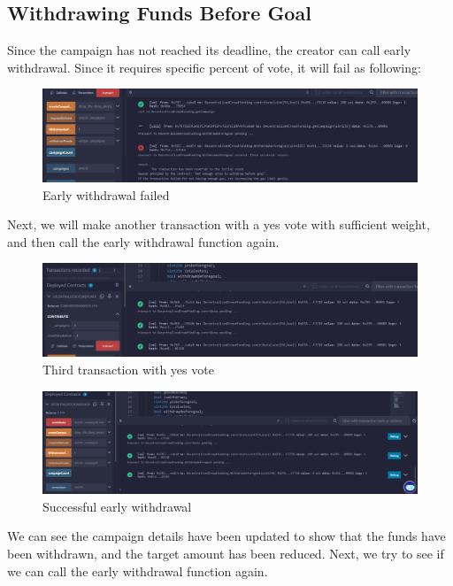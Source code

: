 \documentclass[12pt,reqno]{article}
\begin{document}
\newpage 

\subsection{Withdrawing Funds Before Goal}
Since the campaign has not reached its deadline, the creator can call early 
withdrawal. Since it requires specific percent of vote, it will fail as following: 
\begin{figure}[h!]
    \centering
    \includegraphics[width=0.6\linewidth]{Pictures/early_withdraw1.png}
    \caption{Early withdrawal failed}
    \label{early_withdraw1}
\end{figure}
Next, we will make another transaction with a yes vote with sufficient weight, and 
then call the early withdrawal function again.
\begin{figure}[h!]
    \centering
    \includegraphics[width=0.6\linewidth]{Pictures/third_transaction.png}
    \caption{Third transaction with yes vote}
    \label{third_transaction}
\end{figure}

\begin{figure}[h!]
    \centering
    \includegraphics[width=0.6\linewidth]{Pictures/early_withdraw2.png}
    \caption{Successful early withdrawal}
    \label{early_withdraw2}
\end{figure}

We can see the campaign details have been updated to show that the funds have been withdrawn, 
and the target amount has been reduced. Next, we try to see if we can call 
the early withdrawal function again.
\end{document}
